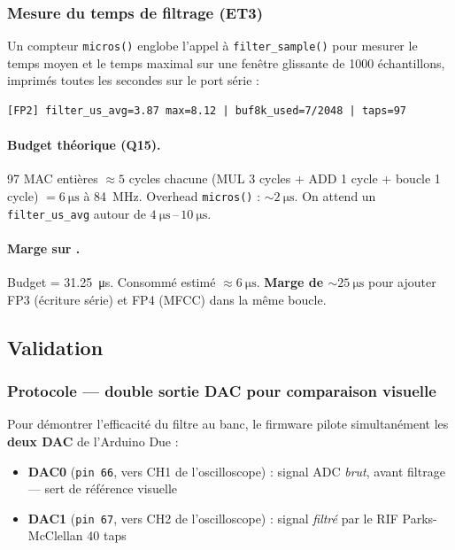 \subsubsection{Mesure du temps de filtrage (ET3)}

Un compteur \verb|micros()| englobe l'appel à \verb|filter_sample()| pour mesurer le temps moyen et le temps maximal sur une fenêtre glissante de 1000 échantillons, imprimés toutes les secondes sur le port série :

\begin{verbatim}
[FP2] filter_us_avg=3.87 max=8.12 | buf8k_used=7/2048 | taps=97
\end{verbatim}

\paragraph{Budget théorique (Q15).} 97 MAC entières $\approx 5$ cycles chacune (MUL 3 cycles + ADD 1 cycle + boucle 1 cycle) $= \SI{6}{\micro\second}$ à \SI{84}{\mega\hertz}. Overhead \verb|micros()| : $\sim \SI{2}{\micro\second}$. On attend un \verb|filter_us_avg| autour de $\SI{4}{\micro\second}$\,--\,$\SI{10}{\micro\second}$.

\paragraph{Marge sur .} Budget = \SI{31.25}{\micro\second}. Consommé estimé $\approx \SI{6}{\micro\second}$. \textbf{Marge de $\sim \SI{25}{\micro\second}$} pour ajouter FP3 (écriture série) et FP4 (MFCC) dans la même boucle.

\subsection{Validation}

\subsubsection{Protocole --- double sortie DAC pour comparaison visuelle}

Pour démontrer l'efficacité du filtre au banc, le firmware pilote simultanément les \textbf{deux DAC} de l'Arduino Due :

\begin{itemize}
    \item \textbf{DAC0} (\texttt{pin~66}, vers CH1 de l'oscilloscope) : signal ADC \emph{brut}, avant filtrage --- sert de référence visuelle
    \item \textbf{DAC1} (\texttt{pin~67}, vers CH2 de l'oscilloscope) : signal \emph{filtré} par le RIF Parks-McClellan 40 taps
\end{itemize}

